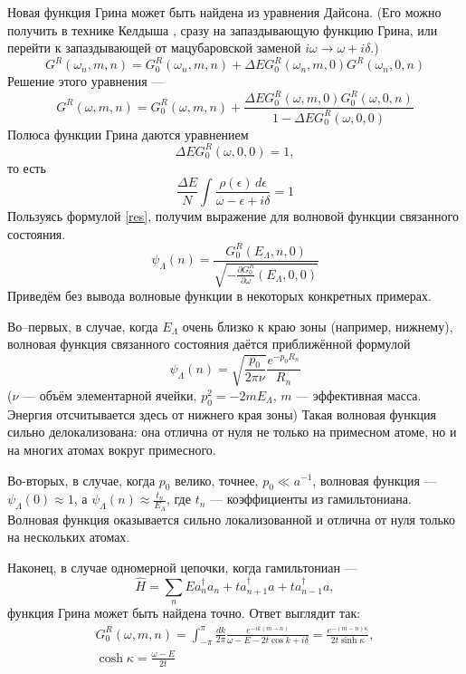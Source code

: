 Новая функция Грина может быть найдена из уравнения Дайсона.
(Его можно получить в технике Келдыша \cite{Keldysh1964}, \cite{Arseev2015} сразу на запаздывающую функцию Грина, или
перейти к запаздывающей от мацубаровской заменой $i\omega \to \omega + i\delta$.)
\begin{equation}
	G^R(\omega_n,m,n) = 
		G^R_0(\omega_n, m,n) + 
		\Delta E G^R_0(\omega_n, m,0)G^R(\omega_n, 0,n)
\end{equation}
Решение этого уравнения --- 
\begin{equation}
	\label{solution}
	G^R(\omega, m,n) = G^R_0(\omega, m,n) + 
		\frac{\Delta EG^R_0(\omega, m,0)G^R_0(\omega, 0, n)}{1 - \Delta E G^R_0(\omega,0,0)}
\end{equation}
Полюса функции Грина даются уравнением
\begin{equation}
	\Delta E G^R_0(\omega, 0,0) = 1,
\end{equation}
то есть 
\begin{equation}
	 \frac{\Delta E}{N}\int  \frac{\rho(\epsilon)\,d\epsilon}{\omega - \epsilon + i\delta}= 1
\end{equation}
Пользуясь формулой \eqref{res}, получим выражение для волновой функции связанного
состояния.
\begin{equation}
	\label{wavefunction}
	\psi_\Lambda(n) = \frac{G_0^R(E_\Lambda, n,0)}
					{\sqrt{-\frac{\partial G_0^R}{\partial \omega}(E_\Lambda, 0,0)}}
\end{equation}
Приведём без вывода волновые функции в некоторых конкретных примерах. 

Во--первых, в случае, когда $E_\Lambda$ очень близко к краю зоны (например, нижнему), 
волновая функция связанного
состояния даётся приближённой формулой
\begin{equation}
	\psi_\Lambda(n) = \sqrt{\frac{p_0}{2\pi \nu}} \frac{e^{-p_0 R_n}}{R_n}
\end{equation}
($\nu$ --- объём элементарной ячейки, $p_0^2 = -2mE_\Lambda$, $m$ --- эффективная масса.
Энергия отсчитывается здесь от нижнего края зоны)
Такая волновая функция сильно делокализована: она отлична от нуля не только на примесном
атоме, но и на многих атомах вокруг примесного.

Во-вторых, в случае, когда $p_0$ велико, точнее, $p_0\ll a^{-1}$, волновая функция ---
$\psi_\Lambda(0) \approx 1$, а 
$\psi_\Lambda(n) \approx \frac{t_n}{E_\Lambda}$, где $t_n$ --- коэффициенты из гамильтониана.
Волновая функция оказывается сильно локализованной и отлична от нуля только на нескольких 
атомах.

Наконец, в случае одномерной цепочки, когда гамильтониан --- 
\begin{equation}
	\label{ham1d}
	\hat{H} = \sum_n Ea_n^\dagger a_n + ta_{n+1}^\dagger a + ta_{n-1}^\dagger a,
\end{equation}
функция Грина может быть найдена точно. Ответ выглядит так:
\begin{multline}
	G_0^R(\omega, m,n) = 
			\int_{-\pi}^{\pi} 
				\frac{dk}{2\pi} \frac{e^{-ik(m-n)}}{\omega - E - 2t \cos{k} + i\delta}
	= \frac{e^{-(m-n)\kappa}}{2t\sinh{\kappa}}, \\
			\cosh \kappa = \frac{\omega  - E}{2t}
\end{multline}
